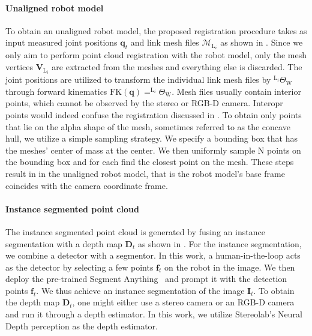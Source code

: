 \paragraph{Unaligned robot model}
\label{c1:sec:unaligned_robot_model}
To obtain an unaligned robot model, the proposed registration procedure takes as input measured joint positions $\mathbf{q}_t$ and link mesh files $\mathcal{M}_{\text{L}_i}$ as shown in . Since we only aim to perform point cloud registration with the robot model, only the mesh vertices $\mathbf{V}_{\text{L}_i}$ are extracted from the meshes and everything else is discarded. The joint positions are utilized to transform the individual link mesh files by $^{\text{L}_i}\Theta_\text{W}$ through forward kinematics $\text{FK}(\mathbf{q}) = ^{\text{L}_i}\Theta_\text{W}$. Mesh files usually contain interior points, which cannot be observed by the stereo or RGB-D camera.
Interopr points would indeed confuse the registration discussed in . To obtain only points that lie on the alpha shape of the mesh, sometimes referred to as the concave hull, we utilize a simple sampling strategy. We specify a bounding box that has the meshes' center of mass at the center. We then uniformly sample N points on the bounding box and for each find the closest point on the mesh. These steps result in in the unaligned robot model, that is the robot model's base frame coincides with the camera coordinate frame.

\paragraph{Instance segmented point cloud}
\label{c1:sec:instance_segmented_point_cloud}
The instance segmented point cloud is generated by fusing an instance segmentation with a depth map $\mathbf{D}_t$ as shown in . For the instance segmentation, we combine a detector with a segmentor. In this work, a human-in-the-loop acts as the detector by selecting a few points $\mathbf{f}_t$ on the robot in the image. We then deploy the pre-trained Segment Anything~\cite{segment_anything} and prompt it with the detection points $\mathbf{f}_t$. We thus achieve an instance segmentation of the image $\mathbf{I}_t$. To obtain the depth map $\mathbf{D}_t$, one might either use a stereo camera or an RGB-D camera and run it through a depth estimator. In this work, we utilize Stereolab's Neural Depth perception as the depth estimator.

